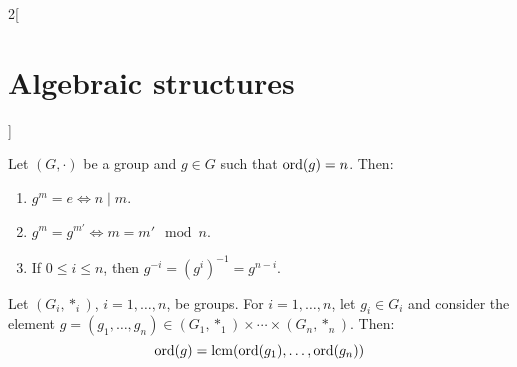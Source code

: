 \documentclass[../../../main_math.tex]{subfiles}
\begin{document}
\begin{multicols}{2}[\section{Algebraic structures}]
  \begin{lemma}
    Let $(G,\cdot)$ be a group and $g\in G$ such that $\operatorname{ord}(g)=n$. Then:
    \begin{enumerate}
      \item $g^m=e\iff n\mid m$.
      \item $g^m=g^{m'}\iff m=m'\mod{n}$.
      \item If $0\leq i\leq n$, then $g^{-i}=(g^i)^{-1}=g^{n-i}$.
    \end{enumerate}
  \end{lemma}
  \begin{corollary}
    Let $(G_i,*_i)$, $i=1,\ldots, n$, be groups. For $i=1,\ldots,n$, let $g_i\in G_i$ and consider the element $g=(g_1,\ldots,g_n)\in(G_1,*_1)\times\cdots\times(G_n,*_n)$. Then: $$\operatorname{ord}(g)=\operatorname{lcm}(\operatorname{ord}(g_1),\ldots,\operatorname{ord}(g_n))$$
  \end{corollary}

\end{multicols}
\end{document}
